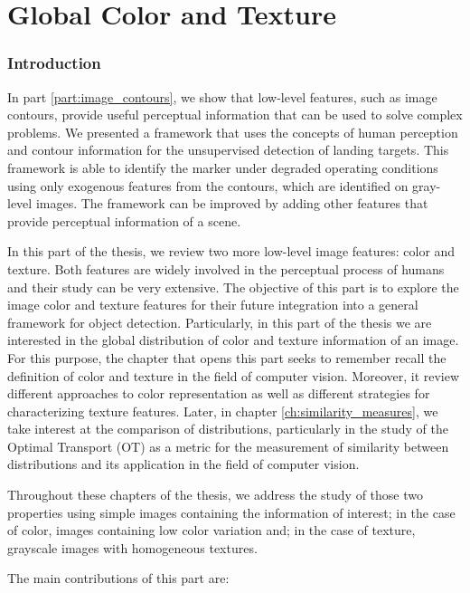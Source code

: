\part{Global Color and Texture}\label{part:global_color_texture}%

\section*{Introduction}
In part \ref{part:image_contours}, we show that low-level features, such as image contours, provide useful perceptual information that can be used to solve complex problems. We presented a framework that uses the concepts of human perception and contour information for the unsupervised detection of landing targets. This framework is able to identify the marker under degraded operating conditions using only exogenous features from the contours, which are identified on gray-level images. The framework can be improved by adding other features that provide perceptual information of a scene.

In this part of the thesis, we review two more low-level image features: color and texture. Both features are widely involved in the perceptual process of humans and their study can be very extensive. The objective of this part is to explore the image color and texture features for their future integration into a general framework for object detection. Particularly, in this part of the thesis we are interested in the global distribution of color and texture information of an image. For this purpose, the chapter that opens this part seeks to remember recall the definition of color and texture in the field of computer vision. Moreover, it review different approaches to color representation as well as different strategies for characterizing texture features. Later, in chapter \ref{ch:similarity_measures}, we take interest at the comparison of distributions, particularly in the study of the Optimal Transport (OT) as a metric for the measurement of similarity between distributions and its application in the field of computer vision.

Throughout these chapters of the thesis, we address the study of those two properties using simple images containing the information of interest; in the case of color, images containing low color variation and; in the case of texture, grayscale images with homogeneous textures.

The main contributions of this part are:

